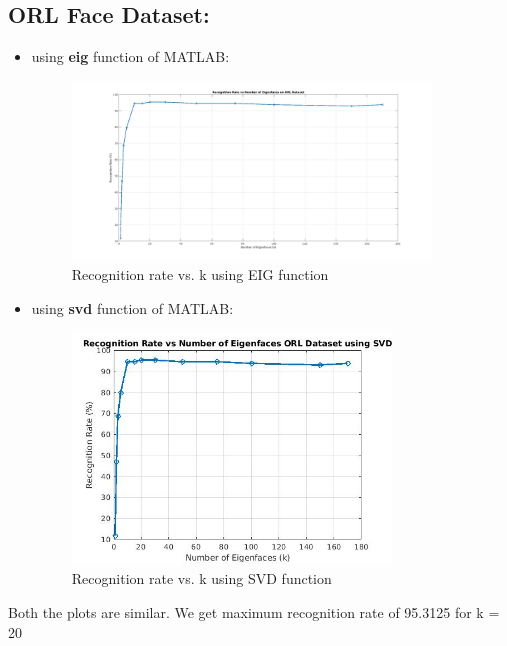 \documentclass{article}
\begin{document}
\begin{enumerate}
\subsection{ORL Face Dataset:}
    \begin{itemize}
        \item using \textbf{eig} function of MATLAB:\\
        \begin{figure}[H]
            \centering
            \includegraphics[width=0.9\textwidth]{../images/ORL_dataset_Recognition_Rate_vs_Number_of_EigenFaces.jpg}
            \caption{Recognition rate vs. k using EIG function}
        \end{figure}
        \item using \textbf{svd} function of MATLAB:
        \begin{figure}[H]
            \centering
            \includegraphics[width=0.8\textwidth]{../images/ORL_dataset_Recognition_Rate_vs_Number_of_EigenFaces_SVD.jpg}
            \caption{Recognition rate vs. k using SVD function}
        \end{figure}
    \end{itemize}
Both the plots are similar. We get maximum recognition rate of 95.3125 for k = 20


\end{enumerate}
\end{document}
